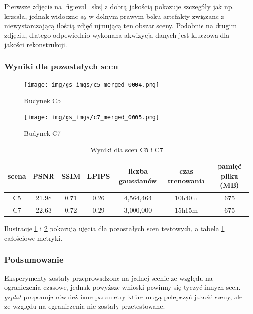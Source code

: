 Pierwsze zdjęcie na \ref{fig:eval_sks} z dobrą jakością pokazuje szczegóły jak np. krzesła, jednak widoczne są w dolnym prawym boku artefakty związane z niewystarczającą ilością zdjęć ujmującą ten obszar sceny. Podobnie na drugim zdjęciu, dlatego odpowiednio wykonana akwizycja danych jest kluczowa dla jakości rekonstrukcji.

\subsubsection{Wyniki dla pozostałych scen}

\begin{figure}[!h]
    \centering
    \texttt{[image: img/gs\_imgs/c5\_merged\_0004.png]}
    \caption{Budynek C5}\label{fig:c5_gt}
\end{figure}

\begin{figure}[!h]
    \centering
    \texttt{[image: img/gs\_imgs/c7\_merged\_0005.png]}
    \caption{Budynek C7}\label{fig:c7_gt}
\end{figure}

\begin{table}[!h]
    \centering
    \begin{tabular}{|c|c|c|c|c|c|c|}
    \hline
    scena & PSNR & SSIM & LPIPS & liczba gaussianów & czas trenowania & pamięć pliku (MB) \\
    \hline 
    C5 & 21.98 & 0.71 & 0.26 & 4,564,464 & 10h40m & 675 \\
    \hline 
    C7 & 22.63 & 0.72 & 0.29 & 3,000,000 & 15h15m & 675 \\
    \hline
    \end{tabular}
\caption{Wyniki dla scen C5 i C7}
\label{table:tab_gs_res}
\end{table}

Ilustracje \ref{fig:c5_gt} i \ref{fig:c7_gt} pokazują ujęcia dla pozostałych scen testowych, a tabela \ref{table:tab_gs_res} całościowe metryki.

\newpage

\subsubsection{Podsumowanie}
Eksperymenty zostały przeprowadzone na jednej scenie ze względu na ograniczenia czasowe, jednak powyższe wnioski powinny się tyczyć innych scen. \textit{gsplat} proponuje również inne parametry które mogą polepszyć jakość sceny, ale ze względu na ograniczenia nie zostały przetestowane. 